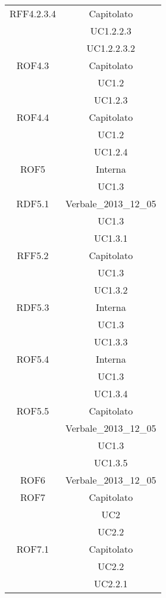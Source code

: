 \begin{longtable}{|c|c|}
\midrule
RFF4.2.3.4
& Capitolato\\
& UC1.2.2.3\\
& UC1.2.2.3.2\\

\midrule
ROF4.3
& Capitolato\\
& UC1.2\\
& UC1.2.3\\

\midrule
ROF4.4
& Capitolato\\
& UC1.2\\
& UC1.2.4\\

\midrule
ROF5
& Interna\\
& UC1.3\\

\midrule
RDF5.1
& Verbale\_2013\_12\_05\\
& UC1.3\\
& UC1.3.1\\

\midrule
RFF5.2
& Capitolato\\
& UC1.3\\
& UC1.3.2\\

\midrule
RDF5.3
& Interna\\
& UC1.3\\
& UC1.3.3\\

\midrule
ROF5.4
& Interna\\
& UC1.3\\
& UC1.3.4\\

\midrule
ROF5.5
& Capitolato\\
& Verbale\_2013\_12\_05\\
& UC1.3\\
& UC1.3.5\\


\midrule
ROF6
& Verbale\_2013\_12\_05\\

\midrule
ROF7
& Capitolato\\
& UC2\\
& UC2.2\\

\midrule
ROF7.1
& Capitolato\\
& UC2.2\\
& UC2.2.1\\


\end{longtable}
